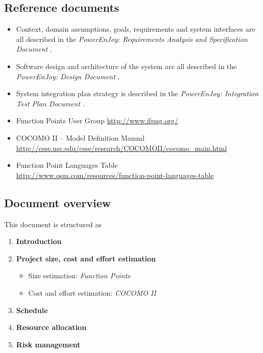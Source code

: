 \subsection{Reference documents}
\begin{itemize}
\item Context, domain assumptions, goals, requirements and system interfaces are all described in the \emph{PowerEnJoy: Requirements Analysis and Specification Document} \cite{RASD}.
\item Software design and architecture of the system are all described in the \emph{PowerEnJoy: Design Document} \cite{DD}.
\item System integration plan strategy is described in the \emph{PowerEnJoy: Integration Test Plan Document} \cite{ITPD}.
\item Function Points User Group \url{http://www.ifpug.org/}
\item COCOMO II – Model Definition Manual \url{http://csse.usc.edu/csse/research/COCOMOII/cocomo_main.html}
\item Function Point Languages Table \\ 
\url{http://www.qsm.com/resources/function-point-languages-table}
\end{itemize}


\subsection{Document overview}
This document is structured as
\begin{enumerate}
	\item \textbf{Introduction}
	\item \textbf{Project size, cost and effort estimation}
	\begin{itemize}
		\item Size estimation: \emph{Function Points}
		\item Cost and effort estimation: \emph{COCOMO II}
	\end{itemize}
	\item \textbf{Schedule}
	\item \textbf{Resource allocation}
	\item \textbf{Risk management}
\end{enumerate}